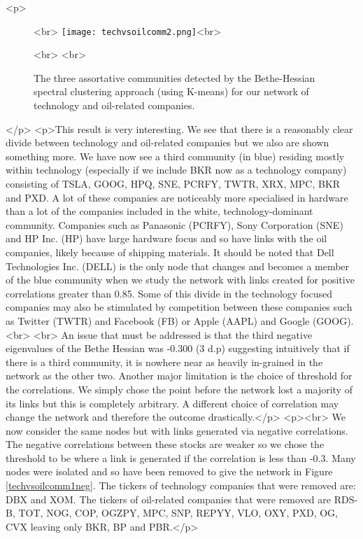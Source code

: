 <p>\begin{figure}%
\centering<br>
\texttt{[image: techvsoilcomm2.png]}<br>
\caption{The three assortative communities detected by the Bethe-Hessian spectral clustering approach (using K-means) for our network of technology and oil-related companies. }<br>
\label{techvsoil3comms}<br>
\end{figure}</p>
<p>This result is very interesting. We see that there is a reasonably clear divide between technology and oil-related companies but we also are shown something more. We have now see a third community (in blue) residing mostly within technology (especially if we include BKR now as a technology company) consisting of TSLA, GOOG, HPQ, SNE, PCRFY, TWTR, XRX, MPC, BKR and PXD. A lot of these companies are noticeably more specialised in hardware than a lot of the companies included in the white, technology-dominant community. Companies such as Panasonic (PCRFY), Sony Corporation (SNE) and HP Inc. (HP) have large hardware focus and so have links with the oil companies, likely because of shipping materials. It should be noted that Dell Technologies Inc. (DELL) is the only node that changes and becomes a member of the blue community when we study the network with links created for positive correlations greater than 0.85. Some of this divide in the technology focused companies may also be stimulated by competition between these companies such as Twitter (TWTR) and Facebook (FB) or Apple (AAPL) and Google (GOOG).<br>
\newline<br>
An issue that must be addressed is that the third negative eigenvalues of the Bethe Hessian was -0.300 (3 d.p) suggesting intuitively that if there is a third community, it is nowhere near as heavily in-grained in the network as the other two. Another major limitation is the choice of threshold for the correlations. We simply chose the point before the network lost a majority of its links but this is completely arbitrary. A different choice of correlation may change the network and therefore the outcome drastically.</p>
<p>\newline<br>
We now consider the same nodes but with links generated via negative correlations. The negative correlations between these stocks are weaker so we chose the threshold to be where a link is generated if the correlation is less than -0.3. Many nodes were isolated and so have been removed to give the network in Figure \ref{techvsoilcomm1neg}. The tickers of technology companies that were removed are: DBX and XOM. The tickers of oil-related companies that were removed are RDS-B, TOT, NOG, COP, OGZPY, MPC, SNP, REPYY, VLO, OXY, PXD, OG, CVX leaving only BKR, BP and PBR.</p>
